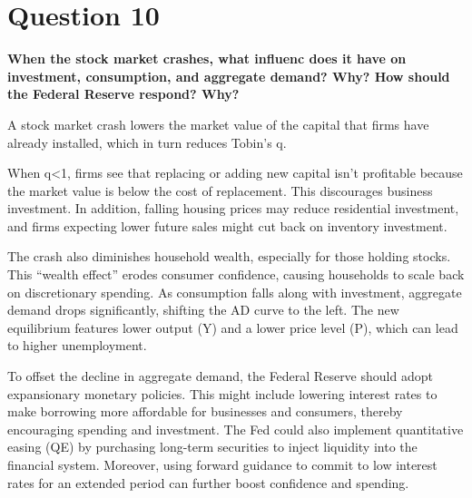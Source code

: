 \newpage 
\small 
\section*{Question 10}
\textbf{When the stock market crashes, what influenc does it have on investment, consumption, and aggregate demand? Why? 
How should the Federal Reserve respond? Why?}


A stock market crash lowers the market value of the capital that firms have already installed, which in turn reduces Tobin's q. 

When q<1, firms see that replacing or adding new capital isn’t profitable because the market value is below the cost of replacement. This discourages business investment. In addition, falling housing prices may reduce residential investment, and firms expecting lower future sales might cut back on inventory investment.

The crash also diminishes household wealth, especially for those holding stocks. This “wealth effect” erodes consumer confidence, causing households to scale back on discretionary spending. As consumption falls along with investment, aggregate demand drops significantly, shifting the AD curve to the left. The new equilibrium features lower output (Y) and a lower price level (P), which can lead to higher unemployment.

To offset the decline in aggregate demand, the Federal Reserve should adopt expansionary monetary policies. This might include lowering interest rates to make borrowing more affordable for businesses and consumers, thereby encouraging spending and investment. The Fed could also implement quantitative easing (QE) by purchasing long-term securities to inject liquidity into the financial system. Moreover, using forward guidance to commit to low interest rates for an extended period can further boost confidence and spending.

